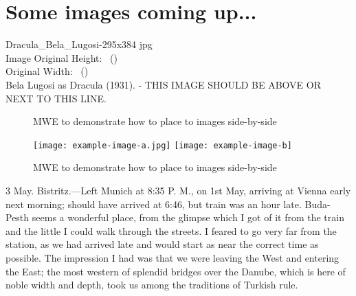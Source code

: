 \section{Some images coming up...}


\renewcommand{\varCaption}{Bela Lugosi as Dracula (1931).}
\renewcommand{\varImgPath}{_content/Dracula_Bela_Lugosi-295x384.jpg}
\settoheight{}
\settowidth{}
Dracula\_Bela\_Lugosi-295x384 jpg \\
Image Original Height: \the\imageheight\ (\printlength{\imageheight}) \\
Original Width: \the\imagewidth\ (\printlength{\imagewidth}) \\


Bela Lugosi as Dracula (1931). - THIS IMAGE SHOULD BE ABOVE OR NEXT TO THIS LINE.

\blindtext
\begin{figure}
\caption{MWE to demonstrate how to place to images side-by-side}
\end{figure}


\begin{figure}
\texttt{[image: example-image-a.jpg]}\hfill
\texttt{[image: example-image-b]}
\caption{MWE to demonstrate how to place to images side-by-side}
\end{figure}
\blindtext


 3 May. Bistritz.---Left Munich at 8:35 P. M., on 1st May, arriving at Vienna early next morning; should have arrived at 6:46, but train was an hour late. Buda-Pesth seems a wonderful place, from the glimpse which I got of it from the train and the little I could walk through the streets. I feared to go very far from the station, as we had arrived late and would start as near the correct time as possible. The impression I had was that we were leaving the West and entering the East; the most western of splendid bridges over the Danube, which is here of noble width and depth, took us among the traditions of Turkish rule.

